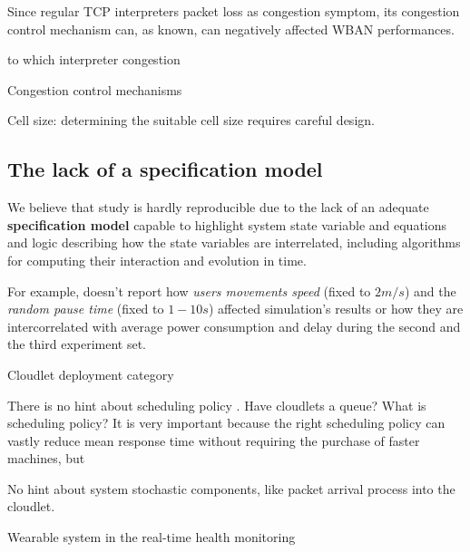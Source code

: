\documentclass[sigchi]{acmart}
\begin{document}
Since regular TCP interpreters packet loss as congestion symptom, its congestion control mechanism can, as known, can negatively affected WBAN performances.














to  which interpreter congestion 

Congestion control mechanisms








Cell size: determining the suitable cell
size requires careful design. 

\subsection{The lack of a specification model}

We believe that \citet{MSAReport} study is hardly reproducible due to the lack of an adequate \textbf{specification model} capable to highlight system state variable and equations and logic describing how the state variables are interrelated, including algorithms for computing their interaction and evolution in time.

For example, \citet{MSAReport} doesn't report how \textit{users movements speed} (fixed to $2 m/s$) and the \textit{random pause time} (fixed to $1-10 s$) affected simulation's results or how they are intercorrelated with average power consumption and delay during the second and the third experiment set.

Cloudlet deployment category 

There is no hint about scheduling policy . Have cloudlets a queue? What is scheduling policy? It is very important because the right scheduling policy can vastly reduce
mean response time without requiring the purchase of faster machines, but 





No hint about system stochastic components, like packet arrival process into the cloudlet.





Wearable system in the real-time health monitoring
\end{document}
